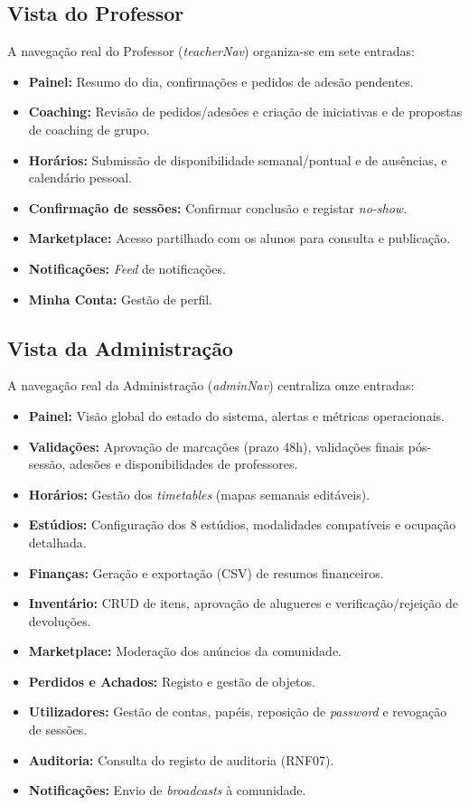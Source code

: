 \documentclass[12pt,a4paper]{report}
\begin{document}
\subsection{Vista do Professor}
A navegação real do Professor (\textit{teacherNav}) organiza-se em sete entradas:
\begin{itemize}
    \item \textbf{Painel:} Resumo do dia, confirmações e pedidos de adesão pendentes.
    \item \textbf{Coaching:} Revisão de pedidos/adesões e criação de iniciativas e de propostas de coaching de grupo.
    \item \textbf{Horários:} Submissão de disponibilidade semanal/pontual e de ausências, e calendário pessoal.
    \item \textbf{Confirmação de sessões:} Confirmar conclusão e registar \textit{no-show}.
    \item \textbf{Marketplace:} Acesso partilhado com os alunos para consulta e publicação.
    \item \textbf{Notificações:} \textit{Feed} de notificações.
    \item \textbf{Minha Conta:} Gestão de perfil.
\end{itemize}

\subsection{Vista da Administração}
A navegação real da Administração (\textit{adminNav}) centraliza onze entradas:
\begin{itemize}
    \item \textbf{Painel:} Visão global do estado do sistema, alertas e métricas operacionais.
    \item \textbf{Validações:} Aprovação de marcações (prazo 48h), validações finais pós-sessão, adesões e disponibilidades de professores.
    \item \textbf{Horários:} Gestão dos \textit{timetables} (mapas semanais editáveis).
    \item \textbf{Estúdios:} Configuração dos 8 estúdios, modalidades compatíveis e ocupação detalhada.
    \item \textbf{Finanças:} Geração e exportação (CSV) de resumos financeiros.
    \item \textbf{Inventário:} CRUD de itens, aprovação de alugueres e verificação/rejeição de devoluções.
    \item \textbf{Marketplace:} Moderação dos anúncios da comunidade.
    \item \textbf{Perdidos e Achados:} Registo e gestão de objetos.
    \item \textbf{Utilizadores:} Gestão de contas, papéis, reposição de \textit{password} e revogação de sessões.
    \item \textbf{Auditoria:} Consulta do registo de auditoria (RNF07).
    \item \textbf{Notificações:} Envio de \textit{broadcasts} à comunidade.
\end{itemize}
\end{document}
